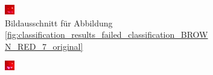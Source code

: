 \begin{figure}[h]
\begin{subfigure}[t]{0.2\textwidth}
                \includegraphics[width=1.0\linewidth]{../common/04_results/resources/classification/failed_classification_BROWN_RED_7_roi.png}
                \caption{Bildausschnitt für Abbildung \ref{fig:classification_results_failed_classification_BROWN_RED_7_original}}
                \label{fig:classification_results_failed_classification_BROWN_RED_7_roi}
        \end{subfigure}
        \hfill
        \begin{subfigure}[t]{0.2\textwidth}
                \raggedright
                \includegraphics[width=1.0\linewidth]{../common/04_results/resources/classification/failed_classification_BROWN_RED_12_roi.png}

\end{subfigure}
\end{figure}
